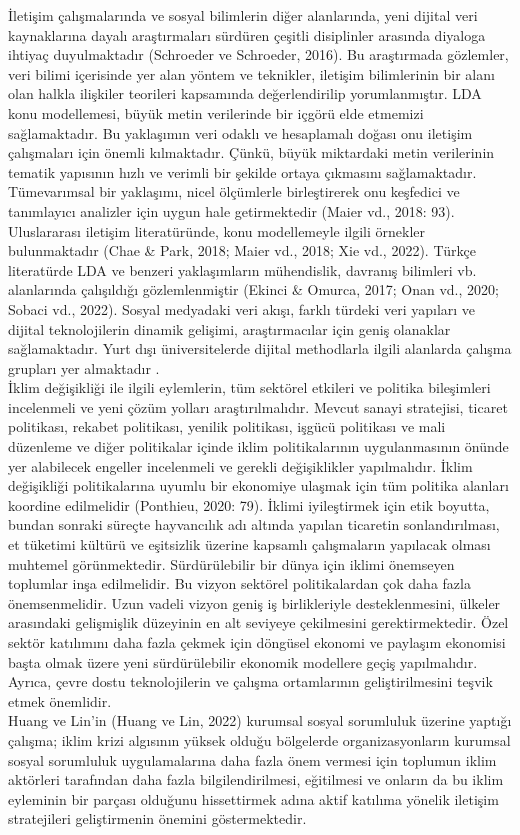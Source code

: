\documentclass[
]{book}
\begin{document}
İletişim çalışmalarında ve sosyal bilimlerin diğer alanlarında, yeni dijital veri kaynaklarına dayalı araştırmaları sürdüren çeşitli disiplinler arasında diyaloga ihtiyaç duyulmaktadır (Schroeder ve Schroeder, 2016). Bu araştırmada gözlemler, veri bilimi içerisinde yer alan yöntem ve teknikler, iletişim bilimlerinin bir alanı olan halkla ilişkiler teorileri kapsamında değerlendirilip yorumlanmıştır.
LDA konu modellemesi, büyük metin verilerinde bir içgörü elde etmemizi sağlamaktadır. Bu yaklaşımın veri odaklı ve hesaplamalı doğası onu iletişim çalışmaları için önemli kılmaktadır. Çünkü, büyük miktardaki metin verilerinin tematik yapısının hızlı ve verimli bir şekilde ortaya çıkmasını sağlamaktadır. Tümevarımsal bir yaklaşımı, nicel ölçümlerle birleştirerek onu keşfedici ve tanımlayıcı analizler için uygun hale getirmektedir (Maier vd., 2018: 93). Uluslararası iletişim literatüründe, konu modellemeyle ilgili örnekler bulunmaktadır (Chae \& Park, 2018; Maier vd., 2018; Xie vd., 2022). Türkçe literatürde LDA ve benzeri yaklaşımların mühendislik, davranış bilimleri vb. alanlarında çalışıldığı gözlemlenmiştir (Ekinci \& Omurca, 2017; Onan vd., 2020; Sobaci vd., 2022). Sosyal medyadaki veri akışı, farklı türdeki veri yapıları ve dijital teknolojilerin dinamik gelişimi, araştırmacılar için geniş olanaklar sağlamaktadır. Yurt dışı üniversitelerde dijital methodlarla ilgili alanlarda çalışma grupları yer almaktadır
.\\
İklim değişikliği ile ilgili eylemlerin, tüm sektörel etkileri ve politika bileşimleri incelenmeli ve yeni çözüm yolları araştırılmalıdır. Mevcut sanayi stratejisi, ticaret politikası, rekabet politikası, yenilik politikası, işgücü politikası ve mali düzenleme ve diğer politikalar içinde iklim politikalarının uygulanmasının önünde yer alabilecek engeller incelenmeli ve gerekli değişiklikler yapılmalıdır. İklim değişikliği politikalarına uyumlu bir ekonomiye ulaşmak için tüm politika alanları koordine edilmelidir (Ponthieu, 2020: 79). İklimi iyileştirmek için etik boyutta, bundan sonraki süreçte hayvancılık adı altında yapılan ticaretin sonlandırılması, et tüketimi kültürü ve eşitsizlik üzerine kapsamlı çalışmaların yapılacak olması muhtemel görünmektedir. Sürdürülebilir bir dünya için iklimi önemseyen toplumlar inşa edilmelidir. Bu vizyon sektörel politikalardan çok daha fazla önemsenmelidir. Uzun vadeli vizyon geniş iş birlikleriyle desteklenmesini, ülkeler arasındaki gelişmişlik düzeyinin en alt seviyeye çekilmesini gerektirmektedir. Özel sektör katılımını daha fazla çekmek için döngüsel ekonomi ve paylaşım ekonomisi başta olmak üzere yeni sürdürülebilir ekonomik modellere geçiş yapılmalıdır. Ayrıca, çevre dostu teknolojilerin ve çalışma ortamlarının geliştirilmesini teşvik etmek önemlidir.\\
Huang ve Lin'in (Huang ve Lin, 2022) kurumsal sosyal sorumluluk üzerine yaptığı çalışma; iklim krizi algısının yüksek olduğu bölgelerde organizasyonların kurumsal sosyal sorumluluk uygulamalarına daha fazla önem vermesi için toplumun iklim aktörleri tarafından daha fazla bilgilendirilmesi, eğitilmesi ve onların da bu iklim eyleminin bir parçası olduğunu hissettirmek adına aktif katılıma yönelik iletişim stratejileri geliştirmenin önemini göstermektedir.
\end{document}
